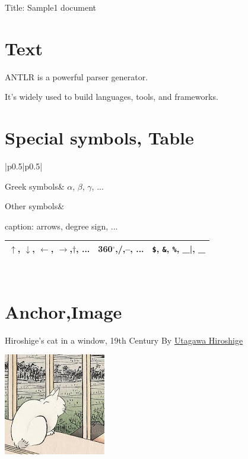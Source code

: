 \documentclass[pdflatex, a4paper, 10pt, jadriver=standard]{bxjsarticle}
\begin{document}
    
        {\Large Title: Sample1 document}\newline\newline
    
\section*{\Large Text}
	ANTLR is a powerful parser generator.\par
	It's widely used to build languages, tools, and frameworks.\par
  
\section*{\Large Special symbols, Table}
\begin{tabular}{|p{}|p{}|}\hline 
		
			Greek symbols&
			$\alpha$, $\beta$, $\gamma$, ...
		\\\hline 
		
			Other symbols&
			
caption: arrows, degree sign, ...\newline 
\begin{tabular}{|p{}|p{}|p{}|}\hline 
				
				
					$\uparrow$, $\downarrow$, $\leftarrow$, $\rightarrow$,$\dagger$, ...&
					360$^\circ$,/,--, ...&
					\verb|$|, \verb|&|, \verb|%|, \_
				\\\hline 
			\end{tabular}
			
		\\\hline 
	\end{tabular}
\par
	
 \section*{\Large Anchor,Image}
	Hiroshige's cat in a window, 19th Century By 
		 \href{https://en.wikipedia.org/wiki/Hiroshige}{Utagawa Hiroshige}
\par
\par
\includegraphics{cat.png}
 
\end{document}
